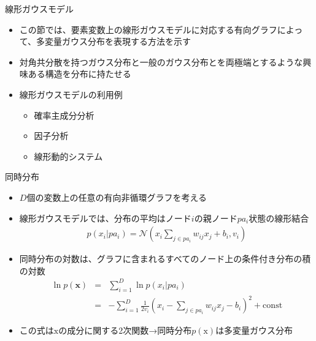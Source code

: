 \begin{frame}{線形ガウスモデル}
 \begin{itemize}
  \item この節では、要素変数上の線形ガウスモデルに対応する有向グラフによって、多変量ガウス分布を表現する方法を示す
  \item 対角共分散を持つガウス分布と一般のガウス分布とを両極端とするような興味ある構造を分布に持たせる
  \item 線形ガウスモデルの利用例
        \begin{itemize}
         \item 確率主成分分析
         \item 因子分析
         \item 線形動的システム
        \end{itemize}
 \end{itemize}
\end{frame}

\begin{frame}{同時分布}
 \begin{itemize}
  \item $D$個の変数上の任意の有向非循環グラフを考える
  \item 線形ガウスモデルでは、分布の平均はノード$i$の親ノード$pa_i$状態の線形結合
        \begin{eqnarray*}
         p(x_i|pa_i) = \mathcal{N} \left(x_i \sum_{j \in pa_i}w_{ij}x_j + b_i, v_i \right)
        \end{eqnarray*}
  \item 同時分布の対数は、グラフに含まれるすべてのノード上の条件付き分布の積の対数
        \begin{eqnarray*}
         \ln p(\bm{x}) &=& \sum_{i=1}^{D}\ln p(x_i | pa_i)\\
         &= & -\sum_{i=1}^{D}\frac{1}{2v_i}(x_i - \sum_{j \in pa_i}w_{ij}x_j-b_i)^2 + \mathrm{const}
        \end{eqnarray*}
  \item この式は$\mathrm{x}$の成分に関する2次関数→\alert{同時分布$p(\mathrm{x})$は多変量ガウス分布}
 \end{itemize}
\end{frame}

